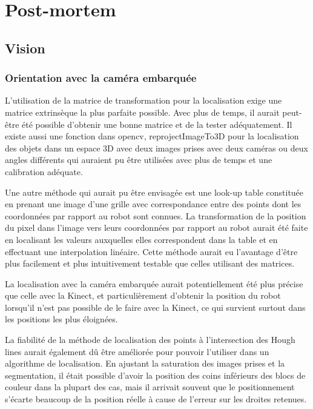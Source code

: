 

\chapter{Post-mortem}

\section{Vision}

\subsection{Orientation avec la caméra embarquée}

L'utilisation de la matrice de transformation pour la localisation exige une matrice extrinsèque la plus parfaite possible. Avec plus de temps, il aurait peut-être été possible d'obtenir une bonne matrice et de la tester adéquatement. Il existe aussi une fonction dans opencv, reprojectImageTo3D pour la localisation des objets dans un espace 3D avec deux images prises avec deux caméras ou deux angles différents qui auraient pu être utilisées avec plus de temps et une calibration adéquate. 

Une autre méthode qui aurait pu être envisagée est une look-up table constituée en prenant une image d'une grille avec correspondance entre des points dont les coordonnées par rapport au robot sont connues. La transformation de la position du pixel dans l'image vers leurs coordonnées par rapport au robot aurait été faite en localisant les valeurs auxquelles elles correspondent dans la table et en effectuant une interpolation linéaire. Cette méthode aurait eu l'avantage d'être plus facilement et plus intuitivement testable que celles utilisant des matrices.

La localisation avec la caméra embarquée aurait potentiellement été plus précise que celle avec la Kinect, et particulièrement d'obtenir la position du robot lorsqu'il n'est pas possible de le faire avec la Kinect, ce qui survient surtout dans les positions les plus éloignées. 

La fiabilité de la méthode de localisation des points à l'intersection des Hough lines aurait également dû être améliorée pour pouvoir l'utiliser dans un algorithme de localisation. En ajustant la saturation des images prises et la segmentation, il était possible d'avoir la position des coins inférieurs des blocs de couleur dans la plupart des cas, mais il arrivait souvent que le positionnement s'écarte beaucoup de la position réelle à cause de l'erreur sur les droites retenues.


